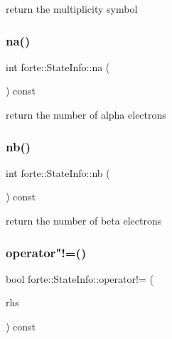 return the multiplicity symbol 

\mbox{\label{classforte_1_1_state_info_ae4ee75f5eab9ec0eafc0d93f2c275da3}} 
\subsubsection{\texorpdfstring{na()}{na()}}
{\footnotesize\ttfamily int forte\+::\+State\+Info\+::na (\begin{DoxyParamCaption}{ }\end{DoxyParamCaption}) const}



return the number of alpha electrons 

\mbox{\label{classforte_1_1_state_info_a87ccf3fb2799d0fad2867625d72e2a85}} 
\subsubsection{\texorpdfstring{nb()}{nb()}}
{\footnotesize\ttfamily int forte\+::\+State\+Info\+::nb (\begin{DoxyParamCaption}{ }\end{DoxyParamCaption}) const}



return the number of beta electrons 

\mbox{\label{classforte_1_1_state_info_a3be1e8e4f810dcf3de3413ca17e607b5}} 
\subsubsection{\texorpdfstring{operator"!=()}{operator!=()}}
{\footnotesize\ttfamily bool forte\+::\+State\+Info\+::operator!= (\begin{DoxyParamCaption}\item[{const \mbox{\hyperlink{classforte_1_1_state_info}{State\+Info}} \&}]{rhs }\end{DoxyParamCaption}) const}



